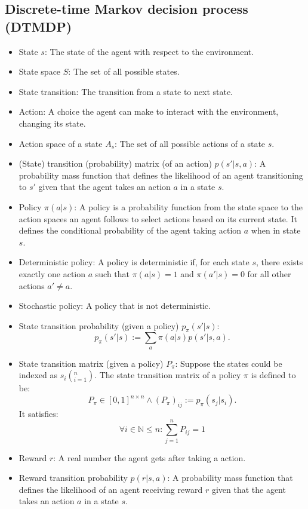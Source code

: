 \documentclass[a4paper,12pt]{report}
\begin{document}
\subsection{Discrete-time Markov decision process (DTMDP)}
\begin{itemize}
\item State $s$: The state of the agent with respect to the environment.
\item State space $S$: The set of all possible states.
\item State transition: The transition from a state to next state.
\item Action: A choice the agent can make to interact with the environment, changing its state.
\item Action space of a state $A_s$: The set of all possible actions of a state $s$.
\item (State) transition (probability) matrix (of an action) $p(s'|s,a)$: A probability mass function that defines the likelihood of an agent transitioning to $s'$ given that the agent takes an action $a$ in a state $s$.
\item Policy $\pi(a|s)$: A policy is a probability function from the state space to the action spaces an agent follows to select actions based on its current state. It defines the conditional probability of the agent taking action $a$ when in state $s$.
\item Deterministic policy: A policy is deterministic if, for each state $s$, there exists exactly one action $a$ such that $\pi(a|s)=1$ and $\pi(a'|s)=0$ for all other actions $a'\neq a$.
\item Stochastic policy: A policy that is not deterministic.
\item State transition probability (given a policy) $p_{\pi}(s'|s)$:
\[p_{\pi}(s'|s):=\sum_a\pi(a|s)p(s'|s,a).\]
\item State transition matrix (given a policy) $P_{\pi}$: Suppose the states could be indexed as $s_i\left(_{i=1}^n\right)$. The state transition matrix of a policy $\pi$ is defined to be:
\[P_{\pi}\in[0,1]^{n\times n}\land (P_{\pi})_{ij}:=p_{\pi}(s_j|s_i).\]
It satisfies:
\[\forall i\in\mathbb{N}\leq n\colon\sum_{j=1}^nP_{ij}=1\]
\item Reward $r$: A real number the agent gets after taking a action.
\item Reward transition probability $p(r|s,a)$: A probability mass function that defines the likelihood of an agent receiving reward $r$ given that the agent takes an action $a$ in a state $s$.

\end{itemize}
\end{document}
